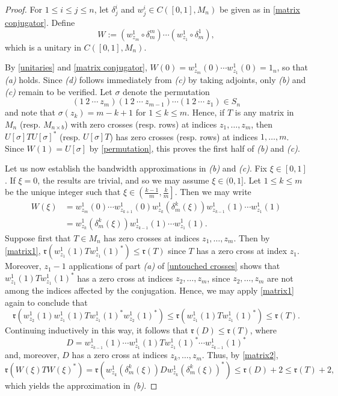 \documentclass[12pt]{amsart}
\numberwithin{equation}{section}
\theoremstyle{definition}
\theoremstyle{remark}
\begin{document}
\begin{proof}	
	For $1\leq i\leq j\leq n$, let $\delta_{j}^{i}$ and $w_{j}^{i}\in C([0,1],M_{n})$ be given as in \autoref{matrix conjugator}. Define 
	$$
	W:=(w_{z_{m}}^{1}\circ\delta_{m}^{m}) \cdots(w_{z_{1}}^{1}\circ\delta_{m}^{1}),
	$$	
	which is a unitary in $C([0,1],M_{n})$.
	
	By \autoref{unitaries} and \autoref{matrix conjugator}, $W(0)=w_{z_{m}}^{1}(0)\cdots w_{z_{1}}^{1}(0)=1_{n}$, so that \textit{(a)} holds. Since \textit{(d)} follows immediately from \textit{(c)} by taking adjoints, only \textit{(b)} and \textit{(c)} remain to be verified. Let $\sigma$ denote the permutation 
	$$
	(1 \ 2 \ \cdots \ z_{m})(1 \ 2 \ \cdots \ z_{m-1})\cdots(1 \ 2 \ \cdots \ z_{1})\in S_{n}
	$$
	and note that $\sigma(z_{k})=m-k+1$ for $1\leq k\leq m$. Hence, if $T$ is any matrix in $M_{n}$ (resp. $M_{n\times b}$) with zero crosses (resp. rows) at indices $z_{1},\ldots,z_{m}$, then $U[\sigma]TU[\sigma]^{*}$ (resp. $U[\sigma]T$) has zero crosses (resp. rows) at indices $1,\ldots,m$. Since $W(1)=U[\sigma]$ by \autoref{permutation}, this proves the first half of \textit{(b)} and \textit{(c)}.
	
	Let us now establish the bandwidth approximations in \textit{(b)} and \textit{(c)}. Fix $\xi\in[0,1]$. If $\xi=0$, the results are trivial, and so we may assume $\xi\in(0,1]$. Let $1\leq k\leq m$ be the unique integer such that $\xi\in\left(\frac{k-1}{m},\frac{k}{m}\right]$. Then we may write
	$$
	\begin{aligned}
	W(\xi)&=w_{z_{m}}^{1}(0)\cdots w_{z_{k+1}}^{1}(0) w_{z_{k}}^{1}(\delta_{m}^{k}(\xi)) w_{z_{k-1}}^{1}(1)\cdots w_{z_{1}}^{1}(1)\\
	&=w_{z_{k}}^{1}(\delta_{m}^{k}(\xi)) w_{z_{k-1}}^{1}(1)\cdots w_{z_{1}}^{1}(1).
	\end{aligned}
	$$
	Suppose first that $T\in M_{n}$ has zero crosses at indices $z_{1},\ldots,z_{m}$. Then by \autoref{matrix1}, $\mathfrak{r}(w_{z_{1}}^{1}(1)Tw_{z_{1}}^{1}(1)^{*})\leq \mathfrak{r}(T)$ since $T$ has a zero cross at index $z_{1}$. Moreover, $z_{1}-1$ applications of part \textit{(a)} of \autoref{untouched crosses} shows that $w_{z_{1}}^{1}(1)Tw_{z_{1}}^{1}(1)^{*}$ has a zero cross at indices $z_{2},\ldots,z_{m}$, since $z_{2},\ldots,z_{m}$ are not among the indices affected by the conjugation. Hence, we may apply \autoref{matrix1} again to conclude that 
	$$
	\mathfrak{r}(w_{z_{2}}^{1}(1)w_{z_{1}}^{1}(1)Tw_{z_{1}}^{1}(1)^{*}w_{z_{2}}^{1}(1)^{*})\leq\mathfrak{r}(w_{z_{1}}^{1}(1)Tw_{z_{1}}^{1}(1)^{*})\leq \mathfrak{r}(T).
	$$
	Continuing inductively in this way, it follows that $\mathfrak{r}(D)\leq\mathfrak{r}(T)$, where 
	$$
	D=w_{z_{k-1}}^{1}(1)\cdots w_{z_{1}}^{1}(1)Tw_{z_{1}}^{1}(1)^{*}\cdots w_{z_{k-1}}^{1}(1)^{*}
	$$
	and, moreover, $D$ has a zero cross at indices $z_{k},\ldots,z_{m}$. Thus, by \autoref{matrix2},
	$$
	\mathfrak{r}(W(\xi)TW(\xi)^{*})=\mathfrak{r}(w_{z_{k}}^{1}(\delta_{m}^{k}(\xi))Dw_{z_{k}}^{1}(\delta_{m}^{k}(\xi))^{*})\leq\mathfrak{r}(D)+2\leq \mathfrak{r}(T)+2,
	$$ 
	which yields the approximation in \textit{(b)}.
	

\end{proof}
\end{document}
